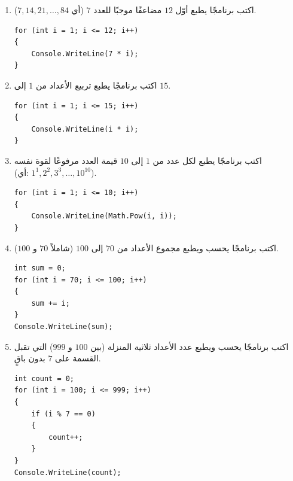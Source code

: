 \documentclass[14pt]{extarticle}
\begin{document}
\begin{enumerate}[resume, itemsep=1em]
\item اكتب برنامجًا يطبع أوّل $12$ مضاعفًا موجبًا للعدد $7$ (أي $7, 14, 21, \dots, 84$).
\ifwithsols
\begin{boxSolution}
\begin{english}
\begin{verbatim}
for (int i = 1; i <= 12; i++)
{
    Console.WriteLine(7 * i);
}
\end{verbatim}
\end{english}
\end{boxSolution}
\fi
\filbreak

\item اكتب برنامجًا يطبع تربيع الأعداد من $1$ إلى $15$.
\ifwithsols
\begin{boxSolution}
\begin{english}
\begin{verbatim}
for (int i = 1; i <= 15; i++)
{
    Console.WriteLine(i * i);
}
\end{verbatim}
\end{english}
\end{boxSolution}
\fi
\filbreak

\item اكتب برنامجًا يطبع لكل عدد من $1$ إلى $10$ قيمة العدد مرفوعًا لقوة نفسه \\
 (أي: $1^1, 2^2, 3^3, \ldots, 10^{10}$).
\ifwithsols
\begin{boxSolution}
\begin{english}
\begin{verbatim}
for (int i = 1; i <= 10; i++)
{
    Console.WriteLine(Math.Pow(i, i));
}
\end{verbatim}
\end{english}
\end{boxSolution}
\fi
\filbreak

\item اكتب برنامجًا يحسب ويطبع مجموع الأعداد من $70$ إلى $100$ (شاملاً $70$ و $100$).
\ifwithsols
\begin{boxSolution}
\begin{english}
\begin{verbatim}
int sum = 0;
for (int i = 70; i <= 100; i++)
{
    sum += i;
}
Console.WriteLine(sum);
\end{verbatim}
\end{english}
\end{boxSolution}
\fi
\filbreak

\item اكتب برنامجًا يحسب ويطبع عدد الأعداد ثلاثية المنزلة (بين $100$ و $999$) التي تقبل القسمة على $7$ بدون باقٍ.
\ifwithsols
\begin{boxSolution}
\begin{english}
\begin{verbatim}
int count = 0;
for (int i = 100; i <= 999; i++)
{
    if (i % 7 == 0)
    {
        count++;
    }
}
Console.WriteLine(count);
\end{verbatim}
\end{english}
\end{boxSolution}
\fi
\filbreak


\end{enumerate}
\end{document}
